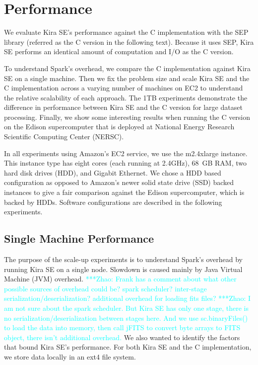 \documentclass[conference]{IEEEtran}
\newcommand{\zhaonote}[1]{{\textcolor{cyan}    { ***Zhao:      #1 }}}
\newcommand{\zhaonote}[1]{}
\begin{document}
\section{Performance}
\label{sec:Performance}

We evaluate Kira SE's performance against the C implementation with the SEP library
(referred as the C version in the following text). Because it uses SEP, Kira SE performs an identical amount of
computation and I/O as the C version.

To understand Spark's overhead, we compare the C implementation against Kira SE on a single
machine. Then we fix the problem size and scale Kira SE and the C implementation across a
varying number of machines on EC2 to understand the relative scalability of each approach.
The 1TB experiments demonstrate the difference in performance between Kira SE and the C version
for large dataset processing. Finally, we show some interesting results when running the C
version on the Edison supercomputer that is deployed at National Energy Research Scientific Computing Center (NERSC).

In all experiments using Amazon's EC2 service, we use the m2.4xlarge instance.
This instance type has eight cores (each running at 2.4GHz), 68~GB RAM, two hard disk drives (HDD), and Gigabit Ethernet. 
We chose a HDD based configuration as opposed to Amazon's newer solid state drive (SSD) backed instances to give a fair comparison
against the Edison supercomputer, which is backed by HDDs. 
Software configurations are described in the following experiments.

\subsection{Single Machine Performance}
\label{sec:Performance-scaleup}

The purpose of the scale-up experiments is to understand Spark's overhead by running
Kira SE on a single node. Slowdown is caused mainly by Java Virtual Machine (JVM) overhead. 
\zhaonote{Frank has a comment about what other possible sources of overhead could be?
spark scheduler? inter-stage serialization/deserialization? additional overhead for loading fits files?}
\zhaonote{I am not sure about the spark scheduler. But Kira SE has only one stage, there is no serialization/deserialization
between stages here. And we use sc.binaryFiles() to load the data into memory, then call jFITS to convert byte arrays to FITS
object, there isn't additional overhead.}
We also wanted to identify the factors
that bound Kira SE's performance. For both Kira SE and the C implementation, we store data
locally in an ext4 file system.
\end{document}
